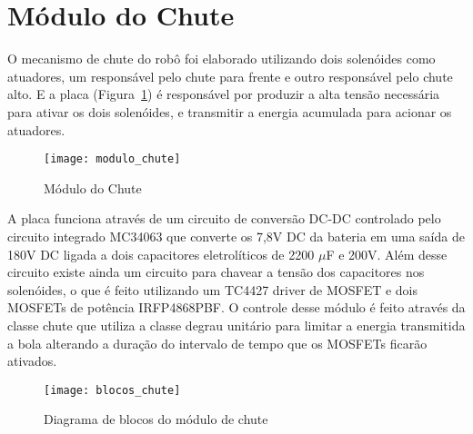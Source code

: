 \section{Módulo do Chute}\label{sec:modulo_chute}

O mecanismo de chute do robô foi elaborado utilizando dois solenóides como atuadores, um responsável pelo chute para frente e outro responsável pelo chute alto. E a placa (Figura~\ref{fig:modulo_chute}) é responsável por produzir a alta tensão necessária para ativar os dois solenóides, e transmitir a energia acumulada para acionar os atuadores.

\begin{figure}
	\centering
	\texttt{[image: modulo\_chute]}
	\caption{Módulo do Chute}
	\label{fig:modulo_chute}
\end{figure}

A placa funciona através de um circuito de conversão DC-DC controlado pelo circuito integrado MC34063 que converte os 7,8V DC da bateria em uma saída de 180V DC ligada a dois capacitores eletrolíticos de 2200 $\mu$F e 200V. Além desse circuito existe ainda um circuito para chavear a tensão dos capacitores nos solenóides, o que é feito utilizando um TC4427 driver de MOSFET e dois MOSFETs de potência IRFP4868PBF. 
O controle desse módulo é feito através da classe chute que utiliza a classe degrau unitário para limitar a energia transmitida a bola alterando a duração do intervalo de tempo que os MOSFETs ficarão ativados.

\begin{figure}
	\centering
	\texttt{[image: blocos\_chute]}
	\caption{Diagrama de blocos do módulo de chute}
	\label{fig:blocos_chute}
\end{figure}


